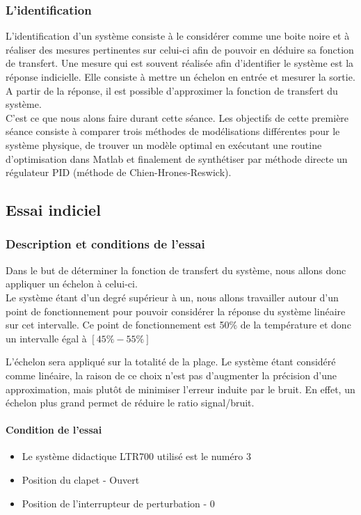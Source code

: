 \subsubsection{L'identification}
L'identification d'un système consiste à le considérer comme une boite noire et à réaliser
des mesures pertinentes sur celui-ci afin de pouvoir en déduire sa fonction de transfert.
Une mesure qui est souvent réalisée afin d'identifier le système est la réponse indicielle.
Elle consiste à mettre un échelon en entrée et mesurer la sortie. A partir de la réponse,
il est possible d'approximer la fonction de transfert du système.\\

C'est ce que nous alons faire durant cette séance. Les objectifs de cette 
première séance consiste à comparer trois méthodes de modélisations 
différentes pour le système physique, de trouver un modèle optimal en exécutant une routine
d'optimisation dans Matlab et finalement de synthétiser par méthode directe un 
régulateur PID (méthode de Chien-Hrones-Reswick).


\subsection{Essai indiciel}
\subsubsection{Description et conditions de l'essai}
Dans le but de déterminer la fonction de transfert du système, nous allons donc appliquer un échelon à celui-ci.\\

Le système étant d'un degré supérieur à un, nous allons travailler autour d'un point de fonctionnement pour pouvoir considérer la réponse du système linéaire sur cet intervalle. Ce point de fonctionnement est 50\% de la température et donc un intervalle égal à $[45\% - 55\%]$

L'échelon sera appliqué sur la totalité de la plage. Le système étant considéré comme linéaire, la raison de ce choix n'est pas d'augmenter la précision d'une approximation, mais plutôt de minimiser l'erreur induite par le bruit. En effet, un échelon plus grand permet de réduire le ratio signal/bruit.\\

\paragraph{Condition de l'essai}
\begin{itemize}
\item Le système didactique LTR700 utilisé est le numéro 3
\item Position du clapet - Ouvert
\item Position de l'interrupteur de perturbation - 0
\end{itemize}

